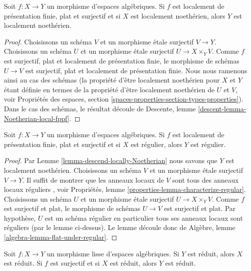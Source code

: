 \begin{lemma}
\label{lemma-descend-locally-Noetherian}
Soit $f : X \to Y$ un morphisme d'espaces algébriques.
Si $f$ est localement de présentation finie, plat et surjectif et si
$X$ est localement noethérien, alors $Y$ est localement noethérien.
\end{lemma}

\begin{proof}
Choisissons un schéma $V$ et un morphisme \'etale surjectif $V \to Y$.
Choisissons un schéma $U$ et un morphisme \'etale surjectif
$U \to X \times_Y V$. Comme $f$ est surjectif, plat et localement de
présentation finie, le morphisme de schémas $U \to V$ est surjectif, plat et
localement de présentation finie. Nous nous ramenons ainsi
au cas des schémas (la propriété d'être localement noethérien pour $X$ et $Y$
étant définie en termes de la propriété d'être localement noethérien de $U$ et $V$, voir
Propriétés des espaces,
section \ref{spaces-properties-section-types-properties}).
Dans le cas des schémas, le résultat découle de
Descente, lemme \ref{descent-lemma-Noetherian-local-fppf}.
\end{proof}

\begin{lemma}
\label{lemma-descend-regular}
Soit $f : X \to Y$ un morphisme d'espaces algébriques.
Si $f$ est localement de présentation finie, plat et surjectif et si
$X$ est régulier, alors $Y$ est régulier.
\end{lemma}

\begin{proof}
Par
Lemme \ref{lemma-descend-locally-Noetherian}
nous savons que $Y$ est localement noethérien.
Choisissons un schéma $V$ et un morphisme \'etale surjectif $V \to Y$.
Il suffit de montrer que les anneaux locaux de $V$ sont tous des anneaux locaux réguliers
, voir
Propriétés, lemme \ref{properties-lemma-characterize-regular}.
Choisissons un schéma $U$ et un morphisme \'etale surjectif
$U \to X \times_Y V$. Comme $f$ est surjectif et plat, le morphisme de schémas
$U \to V$ est surjectif et plat. Par hypothèse, $U$ est un schéma régulier
en particulier tous ses anneaux locaux sont réguliers (par le lemme ci-dessus).
Le lemme découle donc de
Algèbre, lemme \ref{algebra-lemma-flat-under-regular}.
\end{proof}

\begin{lemma}
\label{lemma-reduced-local-smooth}
Soit $f : X \to Y$ un morphisme lisse d'espaces algébriques.
Si $Y$ est réduit, alors $X$ est réduit. Si $f$ est surjectif
et si $X$ est réduit, alors $Y$ est réduit.
\end{lemma}

